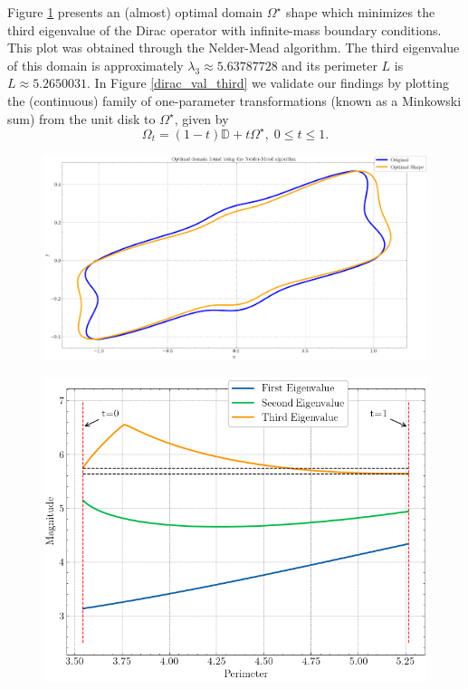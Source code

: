 Figure \ref{dirac_nelder_mead_domain} presents an (almost) optimal domain \(\Omega^\star\) shape which minimizes the third eigenvalue of the Dirac operator with infinite-mass boundary conditions. This plot was obtained through the Nelder-Mead algorithm. The third eigenvalue of this domain is approximately \(\lambda_3 \approx 5.63787728\) and its perimeter \(L\) is \(L \approx 5.2650031\). In Figure \ref{dirac_val_third} we validate our findings by plotting the (continuous) family of one-parameter transformations (known as a Minkowski sum) from the unit disk to \(\Omega^\star\), given by
\[
   \Omega_t = (1-t)\mathbb{D} + t \Omega^\star, \; 0 \leq t \leq 1.
\]
\begin{figure}[!htb]
    \centering
    \begin{minipage}{.5\textwidth}
        \centering
        \includegraphics[width=1\linewidth]{Images/Dirac/smooth/nelder_mead_optimal.png}
        \captionsetup{width=0.8\linewidth} %
        \label{dirac_nelder_mead_domain}
    \end{minipage}%
    \hfill
    \begin{minipage}{.5\textwidth}
        \centering
        \includegraphics[width=0.9\linewidth]{Images/Dirac/smooth/dirac_val_third.png}

\end{minipage}
\end{figure}
